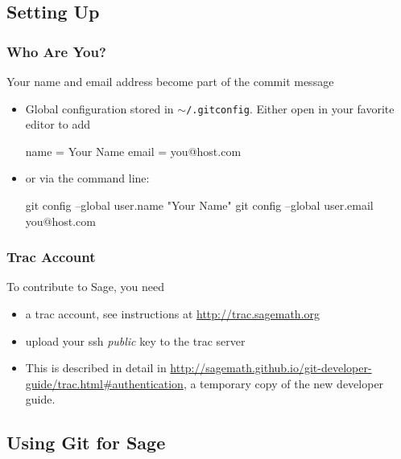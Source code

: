 \subsection{Setting Up}


\begin{frame}[fragile]
  \frametitle{Who Are You?}

  Your name and email address become part of the commit message 
  \begin{itemize}
  \item Global configuration stored in $\sim$\verb#/.gitconfig#. Either
    open in your favorite editor to add
    \begin{shell}
    [user]
        name = Your Name
        email = you@host.com
    \end{shell}
  \item or via the command line:
    \begin{shell}
git config --global user.name "Your Name"
git config --global user.email you@host.com
    \end{shell}    
  \end{itemize}

\end{frame}


\begin{frame}[fragile]
  \frametitle{Trac Account}
  
  To contribute to Sage, you need 
  \begin{itemize}
  \item a trac account, see instructions at \url{http://trac.sagemath.org}
  \item upload your ssh \emph{public} key to the trac server
  \item This is described in detail in
    \url{http://sagemath.github.io/git-developer-guide/trac.html#authentication},
    a temporary copy of the new developer guide.
  \end{itemize}
  
\end{frame}



\subsection{Using Git for Sage}


